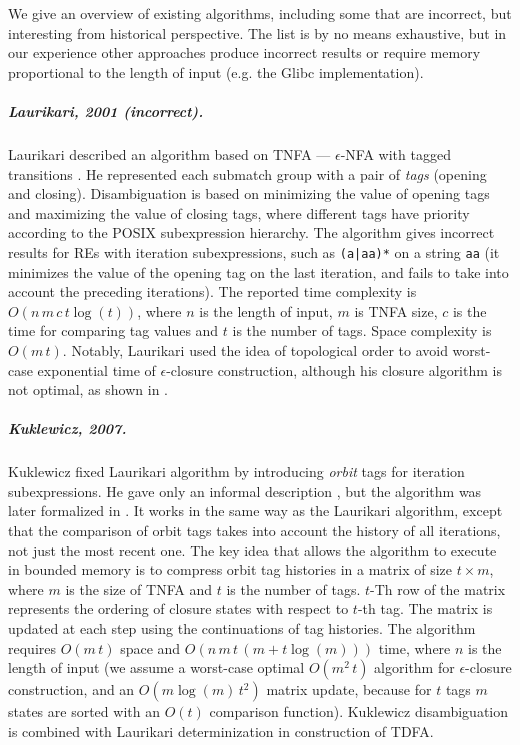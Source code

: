 \documentclass[AMA,STIX1COL]{WileyNJD-v2}
\begin{document}
We give an overview of existing algorithms, including some that are incorrect, but interesting from historical perspective.
The list is by no means exhaustive, but in our experience other approaches
produce incorrect results or require memory proportional to the length of input (e.g. the Glibc implementation\cite{Glibc}).

\subparagraph{Laurikari, 2001 (incorrect).}

Laurikari described an algorithm based on TNFA --- $\epsilon$-NFA with tagged transitions \cite{Lau01}.
He represented each submatch group with a pair of \emph{tags} (opening and closing).
Disambiguation is based on minimizing the value of opening tags and maximizing the value of closing tags, where
different tags have priority according to the POSIX subexpression hierarchy.
The algorithm gives incorrect results for REs with iteration subexpressions, such as \texttt{(a|aa)*} on a string \texttt{aa}
(it minimizes the value of the opening tag on the last iteration,
and fails to take into account the preceding iterations).
The reported time complexity is $O(n \, m \, c \, t \log(t))$, where
$n$ is the length of input,
$m$ is TNFA size,
$c$ is the time for comparing tag values
and $t$ is the number of tags.
Space complexity is $O(m \, t)$.
Notably, Laurikari used the idea of topological order to avoid worst-case exponential time of $\epsilon$-closure construction,
although his closure algorithm is not optimal, as shown in \cite{Tro17}.

\subparagraph{Kuklewicz, 2007.}

Kuklewicz fixed Laurikari algorithm by introducing \emph{orbit} tags for iteration subexpressions.
He gave only an informal description \cite{Kuk07}, but the algorithm was later formalized in \cite{Tro17}.
It works in the same way as the Laurikari algorithm,
except that the comparison of orbit tags takes into account the history of all iterations, not just the most recent one.
The key idea that allows the algorithm to execute in bounded memory
is to compress orbit tag histories in a matrix of size $t \times m$, where $m$ is the size of TNFA and $t$ is the number of tags.
$t$-Th row of the matrix represents the ordering of closure states with respect to $t$-th tag.
The matrix is updated at each step using the continuations of tag histories.
The algorithm requires $O(m \, t)$ space and $O(n \, m \, t \, (m + t \log(m)))$ time, where $n$ is the length of input
(we assume a worst-case optimal $O(m^2 \, t)$ algorithm for $\epsilon$-closure construction,
and an $O(m \log(m) \, t^2)$ matrix update, because for $t$ tags $m$ states are sorted with an $O(t)$ comparison function).
Kuklewicz disambiguation is combined with Laurikari determinization in construction of TDFA\cite{Tro17}.
\end{document}
